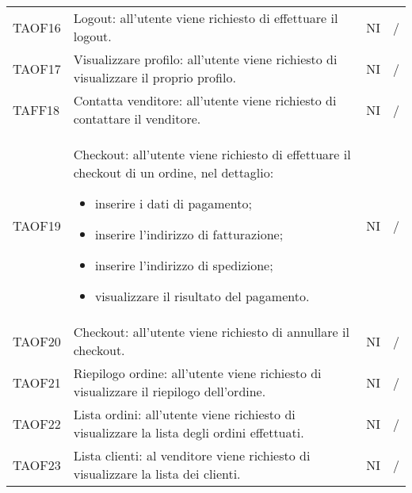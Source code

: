 \begin{center}
\begin{longtable}[!h]{p{60px} p{240px} p{35px} p{35px}}
        TAOF16                           & Logout: all'utente viene richiesto di effettuare il logout.                                                                                                         & NI             & /             \\
        TAOF17                           & Visualizzare profilo: all'utente viene richiesto di visualizzare il proprio profilo.                                                                                & NI             & /             \\
        TAFF18                           & Contatta venditore: all'utente viene richiesto di contattare il venditore.                                                                                          & NI             & /             \\
        TAOF19                           & Checkout: all'utente viene richiesto di effettuare il checkout di un ordine, nel dettaglio: \begin{itemize} \item inserire i dati di pagamento; \item inserire l'indirizzo di fatturazione; \item inserire l'indirizzo di spedizione; \item visualizzare il risultato del pagamento. \end{itemize}                                              & NI             & /             \\
        TAOF20                           & Checkout: all'utente viene richiesto di annullare il checkout.                                                                                                      & NI             & /             \\
        TAOF21                           & Riepilogo ordine: all'utente viene richiesto di visualizzare il riepilogo dell'ordine.                                                                              & NI             & /             \\
        TAOF22                           & Lista ordini: all'utente viene richiesto di visualizzare la lista degli ordini effettuati.                                                                          & NI             & /             \\
        TAOF23                           & Lista clienti: al venditore viene richiesto di visualizzare la lista dei clienti.                                                                                   & NI             & /             \\

\end{longtable}
\end{center}
